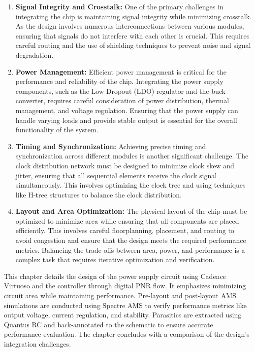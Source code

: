 \begin{enumerate}
    \item \textbf{Signal Integrity and Crosstalk:} One of the primary challenges in integrating the chip is maintaining signal integrity while minimizing crosstalk. As the design involves numerous interconnections between various modules, ensuring that signals do not interfere with each other is crucial. This requires careful routing and the use of shielding techniques to prevent noise and signal degradation.
    
    \item \textbf{Power Management:} Efficient power management is critical for the performance and reliability of the chip. Integrating the power supply components, such as the Low Dropout (LDO) regulator and the buck converter, requires careful consideration of power distribution, thermal management, and voltage regulation. Ensuring that the power supply can handle varying loads and provide stable output is essential for the overall functionality of the system.
    
    \item \textbf{Timing and Synchronization:} Achieving precise timing and synchronization across different modules is another significant challenge. The clock distribution network must be designed to minimize clock skew and jitter, ensuring that all sequential elements receive the clock signal simultaneously. This involves optimizing the clock tree and using techniques like H-tree structures to balance the clock distribution.
    
    \item \textbf{Layout and Area Optimization:} The physical layout of the chip must be optimized to minimize area while ensuring that all components are placed efficiently. This involves careful floorplanning, placement, and routing to avoid congestion and ensure that the design meets the required performance metrics. Balancing the trade-offs between area, power, and performance is a complex task that requires iterative optimization and verification.
\end{enumerate}
This chapter details the design of the power supply circuit using Cadence Virtuoso and the controller through digital PNR flow. It emphasizes minimizing circuit area while maintaining performance. Pre-layout and post-layout AMS simulations are conducted using Spectre AMS to verify performance metrics like output voltage, current regulation, and stability. Parasitics are extracted using Quantus RC and back-annotated to the schematic to ensure accurate performance evaluation. The chapter concludes with a comparison of the design’s integration challenges.